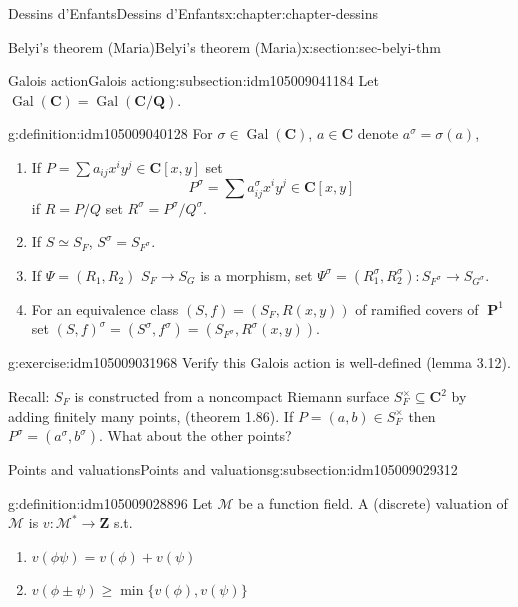 \documentclass[oneside,10pt,]{book}
\numberwithin{equation}{section}
\newcommand{\lb}{[}
\newcommand{\rb}{]}
\newcommand{\ZZ}{\mathbf{Z}}
\newcommand{\QQ}{\mathbf{Q}}
\newcommand{\CC}{\mathbf{C}}
\newcommand{\Gal}[2]{\operatorname{Gal}(#1/#2)}
\DeclareMathOperator{\PP}{\mathbf{P}}
\begin{document}
\begin{chapterptx}{Dessins d'Enfants}{}{Dessins d'Enfants}{}{}{x:chapter:chapter-dessins}
\begin{sectionptx}{Belyi's theorem (Maria)}{}{Belyi's theorem (Maria)}{}{}{x:section:sec-belyi-thm}
%
\begin{subsectionptx}{Galois action}{}{Galois action}{}{}{g:subsection:idm105009041184}
Let \(\operatorname{Gal}(\CC) = \Gal{\CC}{\QQ}\).%
\begin{definition}{}{g:definition:idm105009040128}%
For \(\sigma \in \operatorname{Gal}(\CC)\), \(a\in \CC\) denote \(a^\sigma = \sigma(a)\),%
\begin{enumerate}
\item{}If \(P = \sum a_{ij} x^iy^j \in \CC\lb x,y\rb\) set%
\begin{equation*}
P^\sigma = \sum a^\sigma_{ij} x^iy^j \in \CC\lb x,y\rb
\end{equation*}
if \(R = P/Q\) set \(R^\sigma = P^\sigma / Q^\sigma\).%
\item{}If \(S \simeq S_F\), \(S^\sigma = S_{F^\sigma}\).%
\item{}If \(\Psi = (R_1, R_2)\) \(S_F\to S_G\) is a morphism, set \(\Psi^ \sigma = (R_1^\sigma , R_2 ^\sigma) \colon S_{F^\sigma} \to S_{G^\sigma}\).%
\item{}For an equivalence class \((S,f) = (S_F, R(x,y))\) of ramified covers of \(\PP^1\) set \((S,f)^\sigma = (S^\sigma, f^\sigma) = (S_{F^\sigma}, R^\sigma (x,y))\).%
\end{enumerate}
%
\end{definition}
\begin{inlineexercise}{}{g:exercise:idm105009031968}%
Verify this Galois action is well-defined (lemma 3.12).%
\end{inlineexercise}
Recall: \(S_F\) is    constructed from a noncompact Riemann surface \(S_F^\times \subseteq \CC^2\) by adding finitely many points, (theorem 1.86). If \(P=  (a,b) \in S_F^\times\) then \(P^\sigma = (a^\sigma, b^\sigma)\). What about the other points?%
\end{subsectionptx}
%
%
\typeout{************************************************}
\typeout{************************************************}
%
\begin{subsectionptx}{Points and valuations}{}{Points and valuations}{}{}{g:subsection:idm105009029312}
\begin{definition}{}{g:definition:idm105009028896}%
Let \(\mathcal M\) be a function field. A (discrete) valuation of \(\mathcal M\) is \(v \colon \mathcal M^* \to \ZZ\) s.t.%
\begin{enumerate}
\item{}\(\displaystyle v(\phi\psi) = v(\phi)  + v(\psi)\)%
\item{}\(\displaystyle v(\phi\pm\psi) \ge \min\{ v(\phi)  , v(\psi)\}\)%

\end{enumerate}
\end{definition}
\end{subsectionptx}
\end{sectionptx}
\end{chapterptx}
\end{document}
